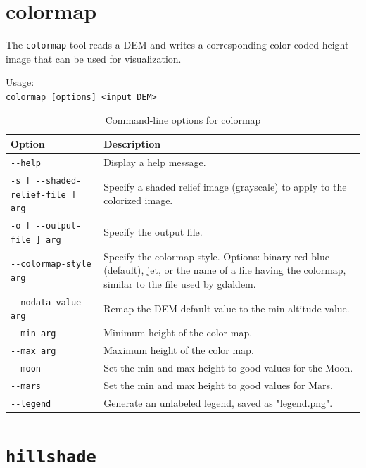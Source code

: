 \section{colormap}
\label{sec:colormap}

The \verb#colormap# tool reads a DEM and writes a corresponding color-coded height image that can be used for visualization.


\medskip

Usage:\\
\hspace*{2em}\texttt{colormap [options] <input DEM>}

\medskip


\begin{longtable}{|l|p{10cm}|}
\caption{Command-line options for colormap}
\label{tbl:colormap}
\endfirsthead
\endhead
\endfoot
\endlastfoot
\hline
Option & Description \\ \hline \hline
\verb#--help# & Display a help message. \\ \hline
\verb#-s [ --shaded-relief-file ] arg# & Specify a shaded relief image (grayscale) to apply to the colorized image. \\ \hline
\verb#-o [ --output-file ] arg# & Specify the output file. \\ \hline
\verb#--colormap-style arg# & Specify the colormap style. Options: binary-red-blue (default), jet, or the name of a file having the colormap, similar to the file used by gdaldem. \\ \hline
\verb#--nodata-value arg# & Remap the DEM default value to the min altitude value. \\ \hline
\verb#--min arg# & Minimum height of the color map. \\ \hline
\verb#--max arg# & Maximum height of the color map. \\ \hline
\verb#--moon# & Set the min and max height to good values for the Moon. \\ \hline
\verb#--mars# & Set the min and max height to good values for Mars. \\ \hline
\verb#--legend# & Generate an unlabeled legend, saved as "legend.png". \\ \hline

\end{longtable}

\section{{\tt hillshade}}
\label{sec:hillshade}

